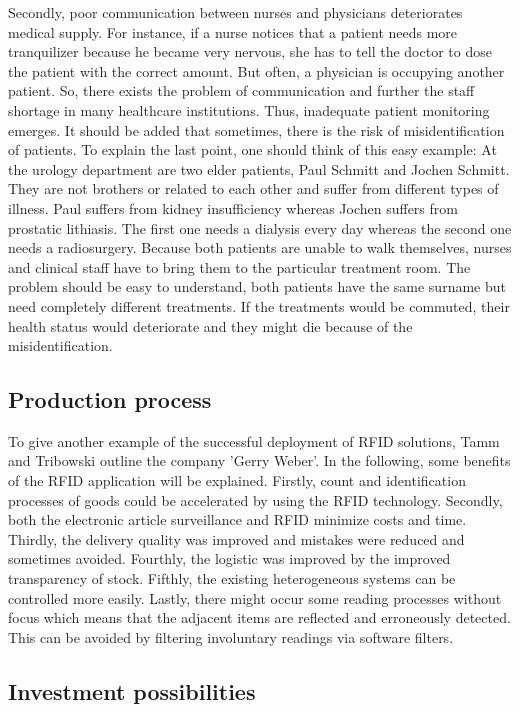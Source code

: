 Secondly, poor communication between nurses and physicians deteriorates medical supply. For instance, if a nurse notices that a patient needs more tranquilizer because he became very nervous, she has to tell the doctor to dose the patient with the correct amount. But often, a physician is occupying another patient. So, there exists the problem of communication and further the staff shortage in many healthcare institutions. Thus, inadequate patient monitoring emerges. It should be added that sometimes, there is the risk of misidentification of patients. To explain the last point, one should think of this easy example: At the urology department are two elder patients, Paul Schmitt and Jochen Schmitt. They are not brothers or related to each other and suffer from different types of illness. Paul suffers from kidney insufficiency whereas Jochen suffers from prostatic lithiasis. The first one needs a dialysis every day whereas the second one needs a radiosurgery. Because both patients are unable to walk themselves, nurses and clinical staff have to bring them to the particular treatment room. The problem should be easy to understand, both patients have the same surname but need completely different treatments. If the treatments would be commuted, their health status would deteriorate and they might die because of the misidentification.

\subsection{Production process}

To give another example of the successful deployment of  RFID solutions, Tamm and Tribowski \cite[p.110 ff.]{fokus} outline the company 'Gerry Weber'. In the following, some benefits of the RFID application will be explained. Firstly, count and identification processes of goods could be accelerated by using the RFID technology. Secondly, both the electronic article surveillance and RFID minimize costs and time. Thirdly, the delivery quality was improved and mistakes were reduced and sometimes avoided. Fourthly, the logistic was improved by the improved transparency of stock. Fifthly, the existing heterogeneous systems can be controlled more easily. Lastly, there might occur some reading processes without focus which means that the adjacent items are reflected and erroneously detected. This can be avoided by filtering involuntary readings via software filters.  

\subsection{Investment possibilities}


